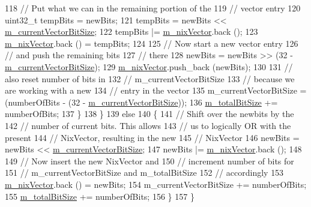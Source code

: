 \begin{DoxyCode}
118           \textcolor{comment}{// Put what we can in the remaining portion of the }
119           \textcolor{comment}{// vector entry}
120           uint32\_t tempBits = newBits;
121           tempBits = newBits << \hyperlink{classns3_1_1NixVector_ad2514d7b869b341fbe23f5cd54d92f58}{m\_currentVectorBitSize};
122           tempBits |= \hyperlink{classns3_1_1NixVector_a8e3d193156da514255bb033ceb8500df}{m\_nixVector}.back ();
123           \hyperlink{classns3_1_1NixVector_a8e3d193156da514255bb033ceb8500df}{m\_nixVector}.back () = tempBits;
124 
125           \textcolor{comment}{// Now start a new vector entry}
126           \textcolor{comment}{// and push the remaining bits }
127           \textcolor{comment}{// there}
128           newBits = newBits >> (32 - \hyperlink{classns3_1_1NixVector_ad2514d7b869b341fbe23f5cd54d92f58}{m\_currentVectorBitSize});
129           \hyperlink{classns3_1_1NixVector_a8e3d193156da514255bb033ceb8500df}{m\_nixVector}.push\_back (newBits);
130 
131           \textcolor{comment}{// also reset number of bits in}
132           \textcolor{comment}{// m\_currentVectorBitSize}
133           \textcolor{comment}{// because we are working with a new }
134           \textcolor{comment}{// entry in the vector}
135           m\_currentVectorBitSize = (numberOfBits - (32 - \hyperlink{classns3_1_1NixVector_ad2514d7b869b341fbe23f5cd54d92f58}{m\_currentVectorBitSize}));
136           \hyperlink{classns3_1_1NixVector_a7a49e3aa07e9d0d45fd509dc5f95857a}{m\_totalBitSize} += numberOfBits;
137         \}
138     \}
139   \textcolor{keywordflow}{else}
140     \{
141       \textcolor{comment}{// Shift over the newbits by the}
142       \textcolor{comment}{// number of current bits.  This allows }
143       \textcolor{comment}{// us to logically OR with the present }
144       \textcolor{comment}{// NixVector, resulting in the new }
145       \textcolor{comment}{// NixVector}
146       newBits = newBits << \hyperlink{classns3_1_1NixVector_ad2514d7b869b341fbe23f5cd54d92f58}{m\_currentVectorBitSize};
147       newBits |= \hyperlink{classns3_1_1NixVector_a8e3d193156da514255bb033ceb8500df}{m\_nixVector}.back ();
148 
149       \textcolor{comment}{// Now insert the new NixVector and }
150       \textcolor{comment}{// increment number of bits for}
151       \textcolor{comment}{// m\_currentVectorBitSize and m\_totalBitSize}
152       \textcolor{comment}{// accordingly }
153       \hyperlink{classns3_1_1NixVector_a8e3d193156da514255bb033ceb8500df}{m\_nixVector}.back () = newBits;
154       m\_currentVectorBitSize += numberOfBits;
155       \hyperlink{classns3_1_1NixVector_a7a49e3aa07e9d0d45fd509dc5f95857a}{m\_totalBitSize} += numberOfBits;
156     \}
157 \}
\end{DoxyCode}
